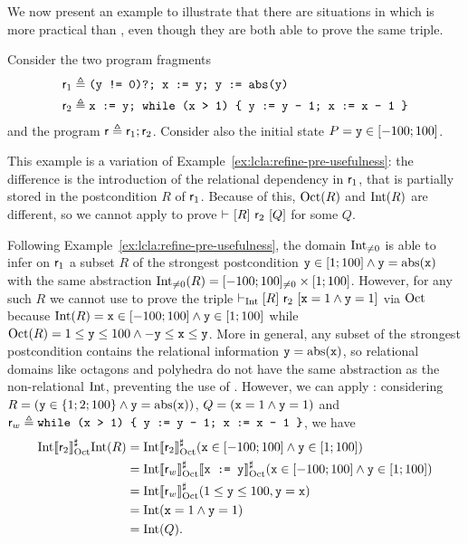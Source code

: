 We now present an example to illustrate that there are situations in which  is more practical than , even though they are both able to prove the same triple.
\begin{example}
	Consider the two program fragments
	\begin{align*}
		\mathsf{r}_1 &\triangleq \texttt{(y != 0)?; x := y; y := abs(y)} \\
		\mathsf{r}_2 &\triangleq \texttt{x := y; while (x > 1) \{ y := y - 1; x := x - 1 \}}
	\end{align*}
	and the program $\mathsf{r} \triangleq \mathsf{r}_1; \mathsf{r}_2$. Consider also the initial state $P = \texttt{y} \in [-100; 100]$.
	
	This example is a variation of Example~\ref{ex:lcla:refine-pre-usefulness}: the difference is the introduction of the relational dependency  in $\mathsf{r}_1$, that is partially stored in the postcondition $R$ of $\mathsf{r}_1$. Because of this, $\text{Oct}(R)$ and $\text{Int}(R)$ are different, so we cannot apply  to prove $\vdash_{}\nobreak[R]~\mathsf{r}_2~[Q]$ for some $Q$.
	
	
	Following Example~\ref{ex:lcla:refine-pre-usefulness}, the domain $\text{Int}_{\neq 0}$ is able to infer on $\mathsf{r}_1$ a subset $R$ of the strongest postcondition $\texttt{y} \in [1; 100] \land \texttt{y} = \text{abs}(\texttt{x})$ with the same abstraction $\text{Int}_{\neq 0}(R) = [-100; 100]_{\neq 0} \times [1; 100]$. However, for any such $R$ we cannot use  to prove the triple $\vdash_{\text{Int}}\nobreak[R]~\mathsf{r}_2~[\texttt{x} = 1 \land \texttt{y} = 1]$ via $\text{Oct}$ because $\text{Int}(R) = \texttt{x} \in [-100; 100] \land \texttt{y} \in [1; 100]$ while $\text{Oct}(R) = 1 \le \texttt{y} \le 100 \land -\texttt{y} \le \texttt{x} \le \texttt{y}$. More in general, any subset of the strongest postcondition contains the relational information $\texttt{y} = \text{abs}(\texttt{x})$, so relational domains like octagons and polyhedra \cite{CH78} do not have the same abstraction as the non-relational $\text{Int}$, preventing the use of . However, we can apply : considering $R = (\texttt{y} \in \{1; 2; 100\} \land \texttt{y} = \text{abs}(\texttt{x}) )$, $Q = (\texttt{x} = 1 \land \texttt{y} = 1)$ and $\mathsf{r}_w \triangleq \texttt{while (x > 1) \{ y := y - 1; x := x - 1 \}}$, we have
	\begin{align*}
		\text{Int} \llbracket\mathsf{r}_2\rrbracket^{\sharp}_{\text{Oct}} \text{Int}(R) &= \text{Int} \llbracket\mathsf{r}_2\rrbracket^{\sharp}_{\text{Oct}} (\texttt{x} \in [-100; 100] \land \texttt{y} \in [1; 100])\\
		&= \text{Int} \llbracket\mathsf{r}_w\rrbracket^{\sharp}_{\text{Oct}} \llbracket\texttt{x := y}\rrbracket^{\sharp}_{\text{Oct}} (\texttt{x} \in [-100; 100] \land \texttt{y} \in [1; 100]) \\
		&= \text{Int} \llbracket\mathsf{r}_w\rrbracket^{\sharp}_{\text{Oct}} (1 \le \texttt{y} \le 100, \texttt{y} = \texttt{x}) \\
		&= \text{Int}(\texttt{x} = 1 \land \texttt{y} = 1) \\
		&= \text{Int}(Q) .
	\end{align*}
	

\end{example}
